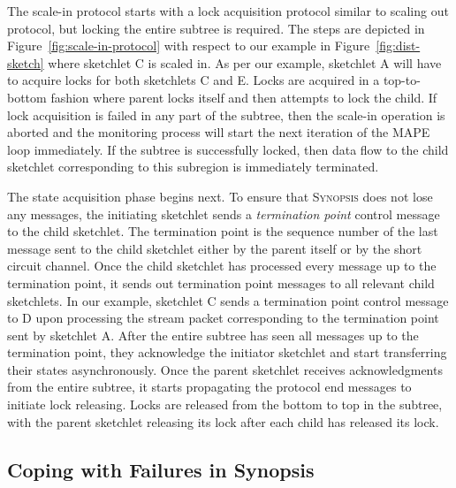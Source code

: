 The scale-in protocol starts with a lock acquisition protocol similar to scaling out protocol, but locking the entire subtree is required.
The steps are depicted in Figure~\ref{fig:scale-in-protocol} with respect to our example in Figure~\ref{fig:dist-sketch} where sketchlet C is scaled in.
As per our example, sketchlet A will have to acquire locks for both sketchlets C and E.
Locks are acquired in a top-to-bottom fashion where parent locks itself and then attempts to lock the child.
If lock acquisition is failed in any part of the subtree, then the scale-in operation is aborted and the monitoring process will start the next iteration of the MAPE loop immediately.
If the subtree is successfully locked, then data flow to the child sketchlet corresponding to this subregion is immediately terminated.

The state acquisition phase begins next.
To ensure that \textsc{Synopsis} does not lose any messages, the initiating sketchlet sends a \emph{termination point} control message to the child sketchlet.
The termination point is the sequence number of the last message sent to the child sketchlet either by the parent itself or by the short circuit channel.
Once the child sketchlet has processed every message up to the termination point, it sends out termination point messages to all relevant child sketchlets. In our example, sketchlet C sends a termination point control message to D upon processing the stream packet corresponding to the termination point sent by sketchlet A.
After the entire subtree has seen all messages up to the termination point, they acknowledge the initiator sketchlet and start transferring their states asynchronously.
Once the parent sketchlet receives acknowledgments from the entire subtree, it starts propagating the protocol end messages to initiate lock releasing.
Locks are released from the bottom to top in the subtree, with the parent sketchlet releasing its lock after each child has released its lock.



\subsection{Coping with Failures in Synopsis}


